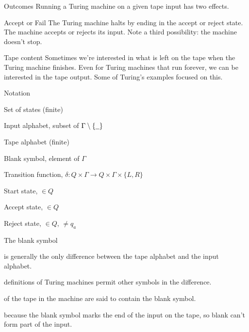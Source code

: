 \begin{frame}{Outcomes}
  Running a Turing machine on a given tape input has two effects.

  \vspace{2mm}
  \begin{alertblock}{Accept or Fail}
    \vspace{2mm}
    The Turing machine halts by ending in the accept or reject state.
    The machine accepts or rejects its input.
    Note a third possibility: the machine doesn't stop.
  \end{alertblock}

  \vspace{2mm}
  \begin{alertblock}{Tape content}
    \vspace{2mm}
    Sometimes we're interested in what is left on the tape when the Turing machine finishes.
    Even for Turing machines that run forever, we can be interested in the tape output.
    Some of Turing's examples focused on this.
  \end{alertblock}
\end{frame}


\begin{frame}{Notation}
  \begin{description}[aaaaaaaa]
    \item[$Q$] Set of states (finite)
    \item[$\Sigma$] Input alphabet, subset of $\Gamma \setminus \{ \underline{\hspace{2mm}} \} $
    \item[$\Gamma$] Tape alphabet (finite)
    \item[\bl] Blank symbol, element of $\Gamma$
    \item[$\delta$] Transition function, $\delta: Q \times \Gamma \rightarrow Q \times \Gamma \times \{L,R\}$
    \item[$q_0$] Start state, $\in Q$
    \item[$q_a$] Accept state, $\in Q$
    \item[$q_r$] Reject state, $\in Q$, $\neq q_a$
  \end{description}
\end{frame}


\begin{frame}{The blank symbol}
  \begin{description}
    \setlength\itemsep{4mm}
    \item[\bl] is generally the only difference between the tape alphabet and the input alphabet.
    \item[Some] definitions of Turing machines permit other symbols in the difference.
    \item[Empty cells] of the tape in the machine are said to contain the blank symbol.
    \item[Important] because the blank symbol marks the end of the input on the tape, so blank can't form part of the input.
  \end{description}
\end{frame}


